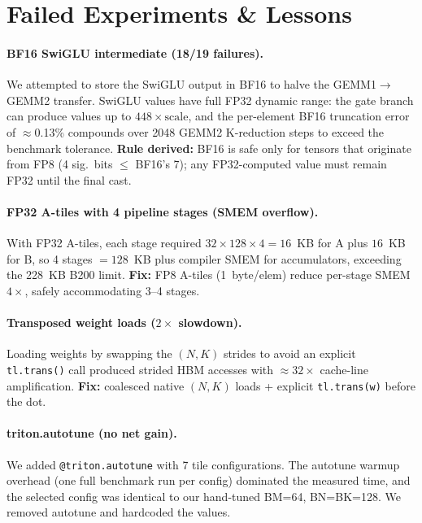 \section{Failed Experiments \& Lessons}
\label{sec:failures}

\paragraph{BF16 SwiGLU intermediate (18/19 failures).}
We attempted to store the SwiGLU output in BF16 to halve the GEMM1$\to$GEMM2 transfer.
SwiGLU values have full FP32 dynamic range: the gate branch can produce values up to $448\!\times\!\text{scale}$, and the per-element BF16 truncation error of ${\approx}$0.13\% compounds over 2048 GEMM2 K-reduction steps to exceed the benchmark tolerance.
\textbf{Rule derived:} BF16 is safe only for tensors that originate from FP8 (4 sig.\ bits $\le$ BF16's 7); any FP32-computed value must remain FP32 until the final cast.

\paragraph{FP32 A-tiles with 4 pipeline stages (SMEM overflow).}
With FP32 A-tiles, each stage required $32\!\times\!128\!\times\!4\!=\!16$~KB for A plus $16$~KB for B, so 4 stages $= 128$~KB plus compiler SMEM for accumulators, exceeding the 228~KB B200 limit.
\textbf{Fix:} FP8 A-tiles (1~byte/elem) reduce per-stage SMEM $4\times$, safely accommodating 3--4 stages.

\paragraph{Transposed weight loads ($2\times$ slowdown).}
Loading weights by swapping the $(N,K)$ strides to avoid an explicit \texttt{tl.trans()} call produced strided HBM accesses with ${\approx}32\times$ cache-line amplification.
\textbf{Fix:} coalesced native $(N,K)$ loads + explicit \texttt{tl.trans(w)} before the dot.

\paragraph{triton.autotune (no net gain).}
We added \texttt{@triton.autotune} with 7 tile configurations.
The autotune warmup overhead (one full benchmark run per config) dominated the measured time, and the selected config was identical to our hand-tuned BM=64, BN=BK=128.
We removed autotune and hardcoded the values.


